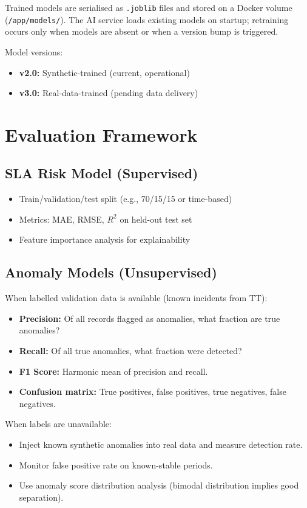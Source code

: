 Trained models are serialised as \texttt{.joblib} files and stored on a Docker volume (\texttt{/app/models/}). The AI service loads existing models on startup; retraining occurs only when models are absent or when a version bump is triggered.

Model versions:
\begin{itemize}
  \item \textbf{v2.0:} Synthetic-trained (current, operational)
  \item \textbf{v3.0:} Real-data-trained (pending data delivery)
\end{itemize}

\section{Evaluation Framework}

\subsection{SLA Risk Model (Supervised)}

\begin{itemize}
  \item Train/validation/test split (e.g., 70/15/15 or time-based)
  \item Metrics: MAE, RMSE, $R^2$ on held-out test set
  \item Feature importance analysis for explainability
\end{itemize}

\subsection{Anomaly Models (Unsupervised)}

When labelled validation data is available (known incidents from TT):
\begin{itemize}
  \item \textbf{Precision:} Of all records flagged as anomalies, what fraction are true anomalies?
  \item \textbf{Recall:} Of all true anomalies, what fraction were detected?
  \item \textbf{F1 Score:} Harmonic mean of precision and recall.
  \item \textbf{Confusion matrix:} True positives, false positives, true negatives, false negatives.
\end{itemize}

When labels are unavailable:
\begin{itemize}
  \item Inject known synthetic anomalies into real data and measure detection rate.
  \item Monitor false positive rate on known-stable periods.
  \item Use anomaly score distribution analysis (bimodal distribution implies good separation).
\end{itemize}

